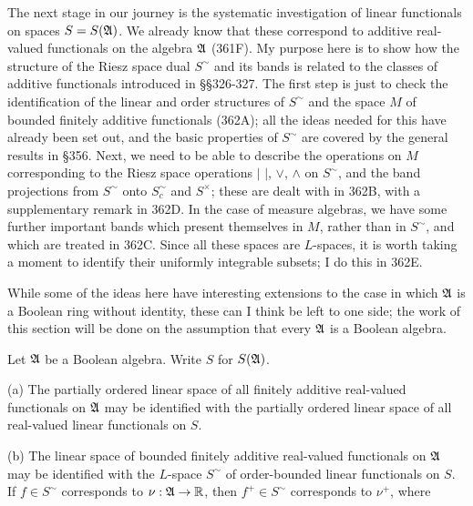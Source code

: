 
\def\chaptername{Function spaces}
\def\sectionname{{$S^{\sim}$}}


The next stage in our journey is the systematic investigation of linear
functionals on spaces $S=S(\frak A)$.   We already know that these
correspond to additive real-valued functionals on the algebra $\frak A$
(361F).   My purpose here is to show how the structure of the Riesz
space dual $S^{\sim}$ and its bands is related to the classes of
additive functionals introduced in \S\S326-327.   The first step is just
to check the identification of the linear and order structures of
$S^{\sim}$ and the space $M$ of bounded finitely additive functionals
(362A);   all the ideas needed for this have already been set out, and
the basic properties of $S^{\sim}$ are covered by the general results in
\S356.   Next, we need to be able to describe the operations on $M$
corresponding to the Riesz space operations $|\,\,|$, $\vee$, $\wedge$
on $S^{\sim}$, and the band projections from $S^{\sim}$
onto $S^{\sim}_c$ and $S^{\times}$;  these are dealt with in 362B, with
a supplementary remark in 362D.   In
the case of measure algebras, we have some further important bands which
present themselves in $M$, rather than in $S^{\sim}$, and which are
treated in 362C.   Since all these spaces are $L$-spaces, it is worth
taking a moment to identify their uniformly integrable subsets;  I do
this in 362E.

While some of the ideas here have interesting extensions to the case in
which $\frak A$ is a Boolean ring without identity, these can I think be
left to one side;  the work of this section will be done on the
assumption that every $\frak A$ is a Boolean algebra.

 Let $\frak A$ be a Boolean algebra.   Write $S$
for $S(\frak A)$.

(a) The partially ordered linear space of all finitely additive
real-valued functionals on $\frak A$ may be identified with the
partially ordered linear space of all real-valued linear functionals on
$S$.

(b) The linear space of bounded finitely additive real-valued
functionals on $\frak A$ may be identified with the $L$-space
$S^{\sim}$ of order-bounded linear functionals on $S$.   If
$f\in S^{\sim}$ corresponds to $\nu:\frak A\to\Bbb R$, then
$f^+\in S^{\sim}$ corresponds to $\nu^+$, where

